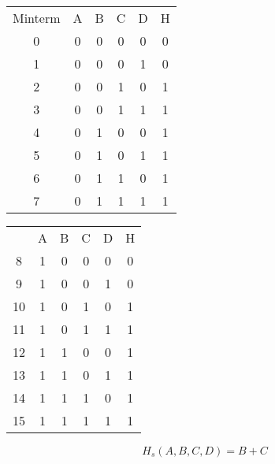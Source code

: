 \documentclass[12pt]{article}
\begin{document}
    \begin{center}
        \begin{tabular}{ccccc|c}
            Minterm & A & B & C & D & H \\
            \cmidrule{2-6}
            0 & 0 & 0 & 0 & 0 & 0 \\
            1 & 0 & 0 & 0 & 1 & 0 \\
            2 & 0 & 0 & 1 & 0 & 1 \\
            3 & 0 & 0 & 1 & 1 & 1 \\
            4 & 0 & 1 & 0 & 0 & 1 \\
            5 & 0 & 1 & 0 & 1 & 1 \\
            6 & 0 & 1 & 1 & 0 & 1 \\
            7 & 0 & 1 & 1 & 1 & 1 \\
        \end{tabular}
        \quad
        \begin{tabular}{ccccc|c}
            & A & B & C & D & H \\
            \cmidrule{2-6}
            8 & 1 & 0 & 0 & 0 & 0 \\
            9 & 1 & 0 & 0 & 1 & 0 \\
            10 & 1 & 0 & 1 & 0 & 1 \\
            11 & 1 & 0 & 1 & 1 & 1 \\
            12 & 1 & 1 & 0 & 0 & 1 \\
            13 & 1 & 1 & 0 & 1 & 1 \\
            14 & 1 & 1 & 1 & 0 & 1 \\
            15 & 1 & 1 & 1 & 1 & 1 \\
        \end{tabular}
    \end{center}
    \[
        H_s\left(A,B,C,D\right) = B+C
    \]
\end{document}
